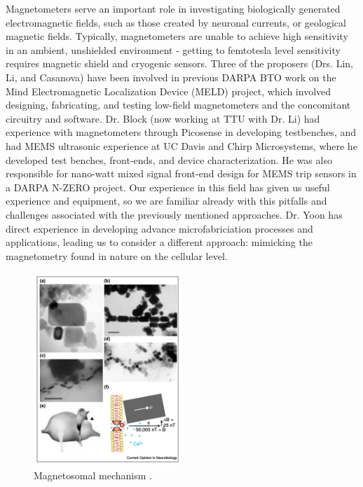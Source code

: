 Magnetometers serve an important role in investigating biologically generated electromagnetic fields, such as those created by neuronal currents, or geological magnetic fields. Typically, magnetometers are unable to achieve high sensitivity in an ambient, unshielded environment - getting to femtotesla level sensitivity requires magnetic shield and cryogenic sensors. Three of the proposers (Drs. Lin, Li, and Casanova) have been involved in previous DARPA BTO work on the Mind Electromagnetic Localization Device (MELD) project, which involved designing, fabricating, and testing low-field magnetometers and the concomitant circuitry and software. Dr. Block (now working at TTU with Dr. Li) had experience with magnetometers through Picosense in developing testbenches, and had MEMS ultrasonic experience at UC Davis and Chirp Microsystems, where he developed test benches, front-ends, and device characterization. He was also responsible for nano-watt mixed signal front-end design for MEMS trip sensors in a DARPA N-ZERO project. Our experience in this field has given us useful experience and equipment, so we are familiar already with this pitfalls and challenges associated with the previously mentioned approaches. Dr. Yoon has direct experience in developing advance microfabriciation processes and applications\cite{yoon2003reduced,yoon2006multidirectional}, leading us to consider a different approach: mimicking the magnetometry found in nature on the cellular level.

\begin{figure}[H]
\centering
\includegraphics[width=0.5\textwidth]{kirsh2001}
\caption{Magnetosomal mechanism \cite{kirschvink2001magnetite}.}
\label{fig:magnetosome}
\end{figure}

